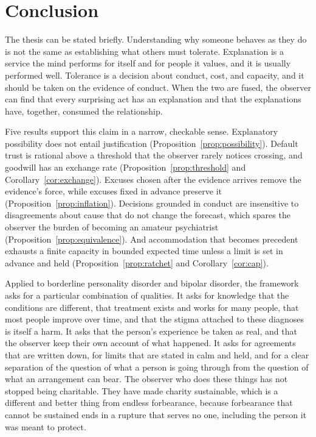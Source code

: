 \documentclass[11pt]{article}
\theoremstyle{definition}
\theoremstyle{remark}
\begin{document}
\section{Conclusion}\label{sec:conclusion}

The thesis can be stated briefly. Understanding why someone behaves as they do is not the same as establishing what others must tolerate. Explanation is a service the mind performs for itself and for people it values, and it is usually performed well. Tolerance is a decision about conduct, cost, and capacity, and it should be taken on the evidence of conduct. When the two are fused, the observer can find that every surprising act has an explanation and that the explanations have, together, consumed the relationship.

Five results support this claim in a narrow, checkable sense. Explanatory possibility does not entail justification (Proposition~\ref{prop:possibility}). Default trust is rational above a threshold that the observer rarely notices crossing, and goodwill has an exchange rate (Proposition~\ref{prop:threshold} and Corollary~\ref{cor:exchange}). Excuses chosen after the evidence arrives remove the evidence's force, while excuses fixed in advance preserve it (Proposition~\ref{prop:inflation}). Decisions grounded in conduct are insensitive to disagreements about cause that do not change the forecast, which spares the observer the burden of becoming an amateur psychiatrist (Proposition~\ref{prop:equivalence}). And accommodation that becomes precedent exhausts a finite capacity in bounded expected time unless a limit is set in advance and held (Proposition~\ref{prop:ratchet} and Corollary~\ref{cor:cap}).

Applied to borderline personality disorder and bipolar disorder, the framework asks for a particular combination of qualities. It asks for knowledge that the conditions are different, that treatment exists and works for many people, that most people improve over time, and that the stigma attached to these diagnoses is itself a harm. It asks that the person's experience be taken as real, and that the observer keep their own account of what happened. It asks for agreements that are written down, for limits that are stated in calm and held, and for a clear separation of the question of what a person is going through from the question of what an arrangement can bear. The observer who does these things has not stopped being charitable. They have made charity sustainable, which is a different and better thing from endless forbearance, because forbearance that cannot be sustained ends in a rupture that serves no one, including the person it was meant to protect.
\end{document}
